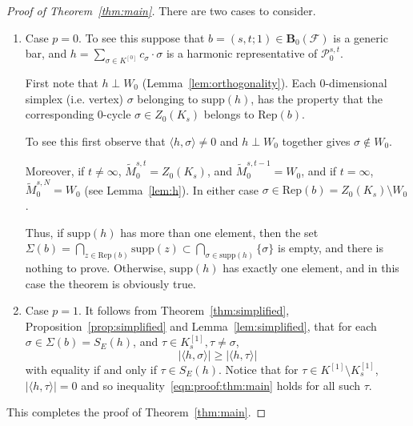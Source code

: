 \documentclass[11pt]{amsart}
\theoremstyle{theorem}
\theoremstyle{remark}
\theoremstyle{definition}
\newcommand {\la}   {{\langle}}
\newcommand {\ra}   {{\rangle}}
\newcommand{\hide}[1]{}
\newcommand{\supp}{\mathrm{supp}}
\newcommand{\Rep}{\mathrm{Rep}}
\begin{document}
\begin{proof}[Proof of Theorem~\ref{thm:main}]
There are two cases to consider.
\begin{enumerate}
\item
Case $p=0$. 
To see this suppose that 
$b = (s,t;1) \in \mathbf{B}_0(\mathcal{F})$ is a generic bar,
and $h = \sum_{\sigma \in K^{[0]}} c_\sigma \cdot \sigma$ is 
a harmonic representative of $\mathcal{P}^{s,t}_0$. 
\hide{
Each $0$-dimensional simplex (i.e. vertex) $\sigma$ belonging to  $\supp(h)$,
belongs to a connected component of $K_s$ disjoint from $K_{s-1}$.
To see this observe that $h \perp W_0 \supset Z_0(K_{s-1}) = C_0(K_{s-1})$
using Lemma~\ref{lem:orthogonality}. So $\supp(h) \cap K_{s-1}^{[0]} = \emptyset$. 
}%

First note that $h \perp W_0$ (Lemma~\ref{lem:orthogonality}).
Each $0$-dimensional simplex (i.e. vertex) $\sigma$ belonging to  $\supp(h)$,
has the property that the corresponding $0$-cycle $\sigma \in Z_0(K_s)$ belongs to $\Rep(b)$.

To see this first observe that
$\la h, \sigma \ra \neq 0$ and $h \perp W_0$ together gives $\sigma \not\in W_0$.

Moreover, if $t \neq \infty$, $ \widetilde{M}_0^{s,t} = Z_0(K_s)$, and $\widetilde{M}_0^{s,t-1} = W_0$, and if $t = \infty$, $\widetilde{M}_0^{s,N} = W_0$ (see Lemma~\ref{lem:h}). 
In either case $\sigma \in \Rep(b) = Z_0(K_s) \setminus W_0$.

Thus, if $\supp(h)$ has more than one element, then the set $\Sigma(b) = \bigcap_{z \in \Rep(b)} \supp(z) \subset \bigcap_{\sigma \in \supp(h)} \{\sigma\}$ is empty, and there is nothing to prove. Otherwise, $\supp(h)$ has exactly one element,  and in this case the theorem is obviously true.
\item
Case $p=1$.
It follows from Theorem~\ref{thm:simplified}, 
 Proposition~\ref{prop:simplified} and Lemma~\ref{lem:simplified}, that
 for each $\sigma \in \Sigma(b) = S_E(h)$, and $\tau \in K_s^{[1]}, \tau \neq \sigma$,
 \begin{equation}
 \label{eqn:proof:thm:main}
   |\la h, \sigma\ra| \geq  |\la h, \tau \ra|  
 \end{equation} 
 with equality if and only if $\tau \in S_E(h)$. Notice that for $\tau \in K^{[1]} \setminus K_s^{[1]}$, $|\la h, \tau \ra| = 0$ and so inequality~\eqref{eqn:proof:thm:main} holds for all such $\tau$.  
\end{enumerate}
This completes the proof of Theorem~\ref{thm:main}.
\end{proof}
\end{document}
